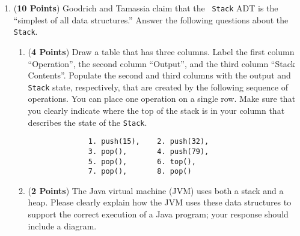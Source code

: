 \documentclass[12pt]{article}
\begin{document}
\begin{enumerate}
        \newpage

      \item ({\bf 10 Points}) Goodrich and Tamassia claim that the {\tt
          Stack} ADT is the ``simplest of all data structures.''  Answer the
        following questions about the {\tt Stack}.

        \begin{enumerate}

          \item ({\bf 4 Points}) Draw a table that has three columns.  Label the
            first column ``Operation'', the second column ``Output'', and the
            third column ``Stack Contents''.  Populate the second and third
            columns with the output and {\tt Stack} state, respectively, that
            are created by the following sequence of operations.  You can place
            one operation on a single row.  Make sure that you clearly indicate
            where the top of the stack is in your column that describes the
            state of the {\tt Stack}.

            \begin{verbatim} 
              1. push(15),    2. push(32), 
              3. pop(),       4. push(79),
              5. pop(),       6. top(), 
              7. pop(),       8. pop() 
            \end{verbatim}

            \vspace*{-.3in}

          \item ({\bf 2 Points}) The Java virtual machine (JVM) uses both a stack and a heap.  Please clearly explain
            how the JVM uses these data structures to support the correct execution of a Java program; your response
            should include a diagram.




\end{enumerate}
\end{enumerate}
\end{document}
